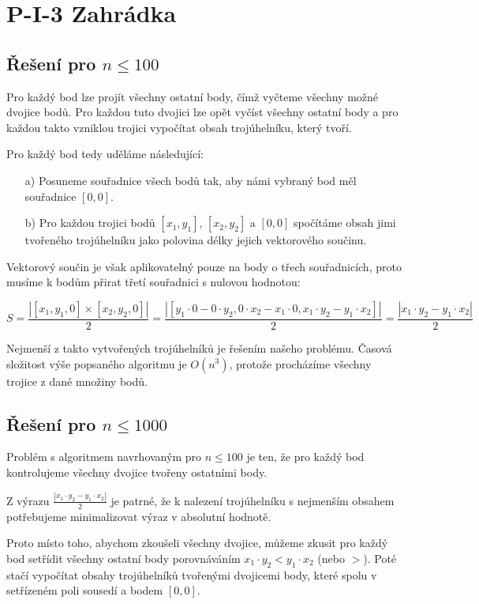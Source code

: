 \documentclass[a4paper, 12pt]{article}
\begin{document}
  \section{P-I-3 Zahrádka}

  \subsection{Řešení pro $n\le100$}
  Pro každý bod lze projít všechny ostatní body, čímž vyčteme všechny možné dvojice bodů. Pro každou tuto dvojici lze opět vyčíst všechny ostatní body a pro každou takto vzniklou trojici vypočítat obsah trojúhelníku, který tvoří.

  Pro každý bod tedy uděláme následující:
  \begin{itemize}
    \item[a)] Posuneme souřadnice všech bodů tak, aby námi vybraný bod měl souřadnice $[0,0]$.
    \item[b)] Pro každou trojici bodů $[x_1,y_1]$, $[x_2,y_2]$ a $[0,0]$ spočítáme obsah jimi tvořeného trojúhelníku jako polovina délky jejich vektorového součinu.
  \end{itemize}

  Vektorový součin je však aplikovatelný pouze na body o třech souřadnicích, proto musíme k bodům přirat třetí souřadnici s nulovou hodnotou:

  $$
  S=\frac{| [x_1,y_1,0]\times[x_2,y_2,0] |}{2}
  =\frac{| [y_1 \cdot 0 - 0 \cdot y_2, 0 \cdot x_2 - x_1 \cdot 0, x_1 \cdot y_2 - y_1 \cdot x_2] |}{2}
  =\frac{| x_1 \cdot y_2 - y_1 \cdot x_2 |}{2}
  $$

  Nejmenší z takto vytvořených trojúhelníků je řešením našeho problému. Časová složitost výše popsaného algoritmu je $O(n^3)$, protože procházíme všechny trojice z dané množiny bodů.

  \subsection{Řešení pro $n\le1000$}
  Problém s algoritmem navrhovaným pro $n\le100$ je ten, že pro každý bod kontrolujeme všechny dvojice tvořeny ostatními body.

  Z výrazu $\frac{| x_1 \cdot y_2 - y_1 \cdot x_2 |}{2}$ je patrné, že k nalezení trojúhelníku s nejmenším obsahem potřebujeme minimalizovat výraz v absolutní hodnotě.

  Proto místo toho, abychom zkoušeli všechny dvojice, můžeme zkusit pro každý bod setřídit všechny ostatní body porovnáváním $x_1 \cdot y_2 < y_1 \cdot x_2$ (nebo $>$). Poté stačí vypočítat obsahy trojúhelníků tvořenými dvojicemi body, které spolu v setřízeném poli sousedí a bodem $[0,0]$.
\end{document}
